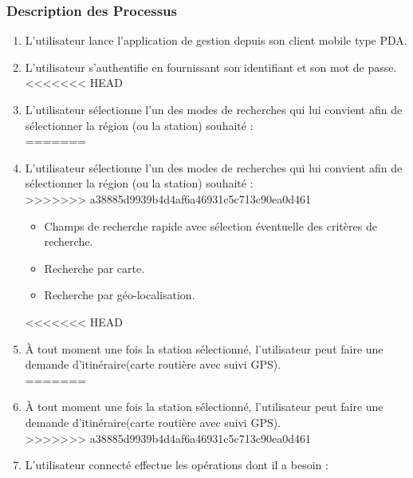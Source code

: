\subsubsection{Description des Processus}

\begin{enumerate}
\item L'utilisateur lance l'application de gestion depuis son client mobile type PDA.\\
\item L'utilisateur s'authentifie en fournissant son identifiant et son mot de passe.\\
<<<<<<< HEAD
\item L'utilisateur sélectionne l'un des modes de recherches qui lui convient afin de sélectionner
 la région (ou la station) souhaité :\\
=======
\item L'utilisateur sélectionne l'un des modes de recherches qui lui convient afin de sélectionner la région (ou la station) souhaité :\\
>>>>>>> a38885d9939b4d4af6a46931c5c713c90ea0d461
	\begin{itemize}
	\item Champs de recherche rapide avec sélection éventuelle des critères de recherche.\\

	\item Recherche par carte.\\

	\item Recherche par géo-localisation.\\
	
	\end{itemize}

<<<<<<< HEAD
	\item À tout moment une fois la station sélectionné, l'utilisateur peut faire une demande 
	d'itinéraire(carte routière avec suivi GPS).\\
=======
	\item À tout moment une fois la station sélectionné, l'utilisateur peut faire une demande d'itinéraire(carte routière avec suivi GPS).\\
>>>>>>> a38885d9939b4d4af6a46931c5c713c90ea0d461

	\item L'utilisateur connecté effectue les opérations dont il a besoin :\\
	

\end{enumerate}
